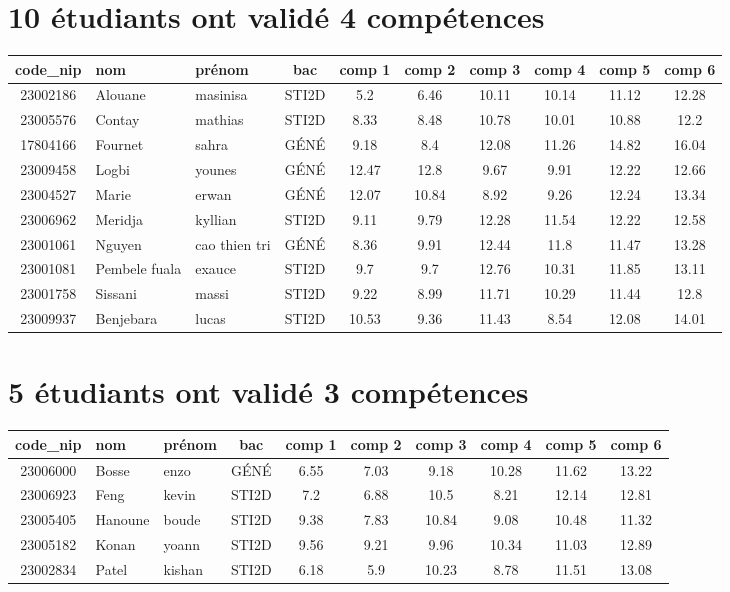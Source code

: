 \documentclass{article}%
\begin{document}
\section*{10 étudiants ont validé 4 compétences}%
\label{sec:10tudiantsontvalid4comptences}%
\begin{tabular}{|c|l|l|c|c|c|c|c|c|c|}%
\hline%
\rowcolor{jaune}%
code\_nip&nom&prénom&bac&comp 1&comp 2&comp 3&comp 4&comp 5&comp 6\\%
\hline%
23002186&Alouane&masinisa&STI2D&5.2&6.46&10.11&10.14&11.12&12.28\\%
\hline%
23005576&Contay&mathias&STI2D&8.33&8.48&10.78&10.01&10.88&12.2\\%
\hline%
17804166&Fournet&sahra&GÉNÉ&9.18&8.4&12.08&11.26&14.82&16.04\\%
\hline%
23009458&Logbi&younes&GÉNÉ&12.47&12.8&9.67&9.91&12.22&12.66\\%
\hline%
23004527&Marie&erwan&GÉNÉ&12.07&10.84&8.92&9.26&12.24&13.34\\%
\hline%
23006962&Meridja&kyllian&STI2D&9.11&9.79&12.28&11.54&12.22&12.58\\%
\hline%
23001061&Nguyen&cao thien tri&GÉNÉ&8.36&9.91&12.44&11.8&11.47&13.28\\%
\hline%
23001081&Pembele fuala&exauce&STI2D&9.7&9.7&12.76&10.31&11.85&13.11\\%
\hline%
23001758&Sissani&massi&STI2D&9.22&8.99&11.71&10.29&11.44&12.8\\%
\hline%
23009937&Benjebara&lucas&STI2D&10.53&9.36&11.43&8.54&12.08&14.01\\%
\hline%
\end{tabular}

%
\section*{5 étudiants ont validé 3 compétences}%
\label{sec:5tudiantsontvalid3comptences}%
\begin{tabular}{|c|l|l|c|c|c|c|c|c|c|}%
\hline%
\rowcolor{jaune}%
code\_nip&nom&prénom&bac&comp 1&comp 2&comp 3&comp 4&comp 5&comp 6\\%
\hline%
23006000&Bosse&enzo&GÉNÉ&6.55&7.03&9.18&10.28&11.62&13.22\\%
\hline%
23006923&Feng&kevin&STI2D&7.2&6.88&10.5&8.21&12.14&12.81\\%
\hline%
23005405&Hanoune&boude&STI2D&9.38&7.83&10.84&9.08&10.48&11.32\\%
\hline%
23005182&Konan&yoann&STI2D&9.56&9.21&9.96&10.34&11.03&12.89\\%
\hline%
23002834&Patel&kishan&STI2D&6.18&5.9&10.23&8.78&11.51&13.08\\%
\hline%
\end{tabular}
\end{document}
